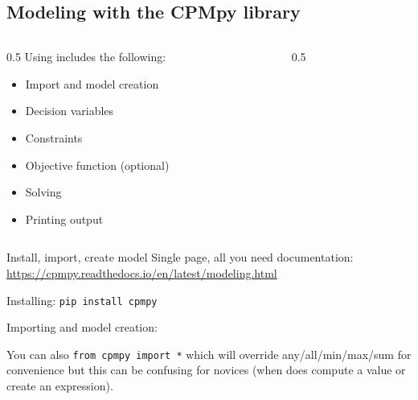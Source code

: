 \documentclass{cons-beamer}
\begin{document}
\begin{flashcardcpmpy}
\section{Modeling with the CPMpy library}

\begin{frame}
  \begin{columns}[T] %
    \begin{column}{0.5\textwidth} %
      \vspace*{5em}
      Using \CPMpy includes the following:
      \begin{itemize}
        \item Import and model creation
        \item Decision variables
        \item Constraints
        \item Objective function (optional)
        \item Solving
        \item Printing output
      \end{itemize}
    \end{column}
    \begin{column}{0.5\textwidth} %
      \begin{example}[Showcase]
        \vspace{-0.5em}
        
      \end{example}
    \end{column}
  \end{columns}
\end{frame}

\begin{frame}{Install, import, create model}
  Single page, all you need documentation: 
  \url{https://cpmpy.readthedocs.io/en/latest/modeling.html}

  \vspace{2em}
  Installing:
  \lstinline[basicstyle=\scriptsize\ttfamily]$pip install cpmpy$

  \vspace{2em}
  Importing and model creation:
  

  \vspace{2em}
  \footnotesize
  You can also \lstinline[language=cpmpy]{from cpmpy import *} which will override any/all/min/max/sum for convenience but this can be confusing for novices (\eg when does  compute a value or create an expression).
\end{frame}


\end{flashcardcpmpy}
\end{document}
